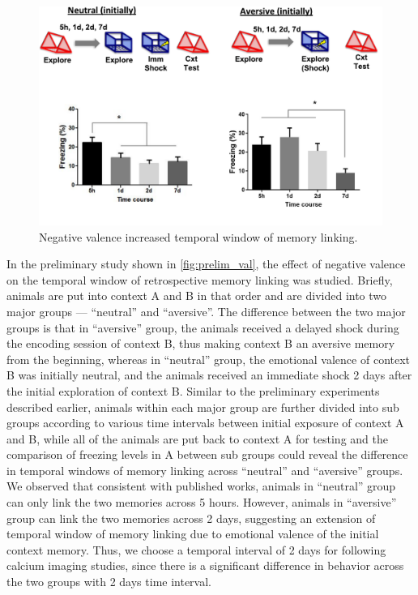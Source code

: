 \documentclass[master.tex]{subfiles}
\begin{document}
\begin{figure}[!h]
  \centering \includegraphics[scale = .15]{Figures/val_retro_prelim.pdf}
  \caption{\footnotesize Negative valence increased temporal window of memory
    linking.}
  \label{fig:prelim_val}
\end{figure}


In the preliminary study shown in \autoref{fig:prelim_val}, the effect of
negative valence on the temporal window of retrospective memory linking was
studied. Briefly, animals are put into context A and B in that order and are
divided into two major groups --- ``neutral'' and ``aversive''. The difference
between the two major groups is that in ``aversive'' group, the animals received
a delayed shock during the encoding session of context B, thus making context B
an aversive memory from the beginning, whereas in ``neutral'' group, the
emotional valence of context B was initially neutral, and the animals received
an immediate shock 2 days after the initial exploration of context B. Similar to
the preliminary experiments described earlier, animals within each major group
are further divided into sub groups according to various time intervals between
initial exposure of context A and B, while all of the animals are put back to
context A for testing and the comparison of freezing levels in A between sub
groups could reveal the difference in temporal windows of memory linking across
``neutral'' and ``aversive'' groups. We observed that consistent with published
works, animals in ``neutral'' group can only link the two memories across 5
hours. However, animals in ``aversive'' group can link the two memories across 2
days, suggesting an extension of temporal window of memory linking due to
emotional valence of the initial context memory. Thus, we choose a temporal
interval of 2 days for following calcium imaging studies, since there is a
significant difference in behavior across the two groups with 2 days time
interval.
\end{document}
